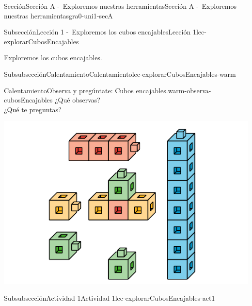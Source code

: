 \documentclass[twoside,10pt,]{article}
\begin{document}
\begin{sectionptx}{Sección}{Sección A -~Exploremos nuestras herramientas}{}{Sección A -~Exploremos nuestras herramientas}{}{}{gra0-uni1-secA}
%
%
\typeout{************************************************}
\typeout{************************************************}
%
\begin{subsectionptx}{Subsección}{Lección 1 -~Exploremos los cubos encajables}{}{Lección 1}{}{}{lec-explorarCubosEncajables}
\begin{introduction}{}%
Exploremos los cubos encajables.%
\end{introduction}%
%
%
\typeout{************************************************}
\typeout{************************************************}
%
\begin{subsubsectionptx}{Subsubsección}{Calentamiento}{}{Calentamiento}{}{}{lec-explorarCubosEncajables-warm}
\begin{exploration}{Calentamiento}{Observa y pregúntate: Cubos encajables.}{warm-observa-cubosEncajables}%
¿Qué observas?\\
¿Qué te preguntas?\begin{image}{0}{1}{0}{}%
\includegraphics[width=\linewidth]{external/svg-source/tikz-file-147993.pdf}
\end{image}%
\end{exploration}%
\end{subsubsectionptx}
%
%
\typeout{************************************************}
\typeout{************************************************}
%
\begin{subsubsectionptx}{Subsubsección}{Actividad 1}{}{Actividad 1}{}{}{lec-explorarCubosEncajables-act1}

\end{subsubsectionptx}
\end{subsectionptx}
\end{sectionptx}
\end{document}
